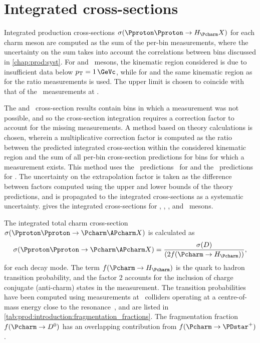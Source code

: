 \section{Integrated cross-sections}
\label{chap:prod:results:integrated}

Integrated production cross-sections $\xsec(\ppToHc{}X)$ for each charm meson 
are computed as the sum of the per-bin measurements, where the uncertainty on 
the sum takes into account the correlations between bins discussed in 
\cref{chap:prod:syst}.
For \PDsplus and \PDstarp\ mesons, the kinematic region considered is 
 due to insufficient data below $\pT = \SI{1}{\GeVc}$, 
while for \PDzero and \PDplus the same kinematic region as for the ratio 
measurements is used.
The upper limit is chosen to coincide with that of the \lhcb\ measurements at 
.

The \PDzero and \PDstarp\ cross-section results contain bins in which a 
measurement was not possible, and so the cross-section integration requires a 
correction factor to account for the missing measurements.
A method based on theory calculations is chosen, wherein a multiplicative 
correction factor is computed as the ratio between the predicted integrated 
cross-section within the considered kinematic region and the sum of all per-bin 
cross-section predictions for bins for which a measurement exists.
This method uses the \nnpdfl\ predictions~\cite{Gauld:2015yia} for \PDzero and 
the \fonll\ predictions~\cite{Cacciari:2015fta} for \PDstarp.
The uncertainty on the extrapolation factor is taken as the difference between 
factors computed using the upper and lower bounds of the theory predictions, 
and is propagated to the integrated cross-sections as a systematic uncertainty.
 gives the integrated 
cross-sections for \PDzero, \PDplus, \PDsplus, and \PDstarp\ mesons.

The integrated total charm cross-section $\xsec(\ppToccbarX)$ is calculated as 
\begin{equation}
  \xsec(\ppToccbarX) = \frac{\xsec(D)}{(2f(\cToHc))},
\end{equation}
for each decay mode.
The term $f(\cToHc)$ is the quark to hadron transition probability, and the 
factor 2 accounts for the inclusion of charge conjugate (anti-charm) states in 
the measurement.
The transition probabilities have been computed using measurements at \epem\ 
colliders operating at a centre-of-mass energy close to the \PUpsilonFourS 
resonance~\cite{PDG2008}, and are listed in 
\cref{tab:prod:introduction:fragmentation_fractions}.
The fragmentation fraction $f(\decay{\Pcharm}{\PDzero})$ has an overlapping 
contribution
from $f(\decay{\Pcharm}{\PDstarp})$.

